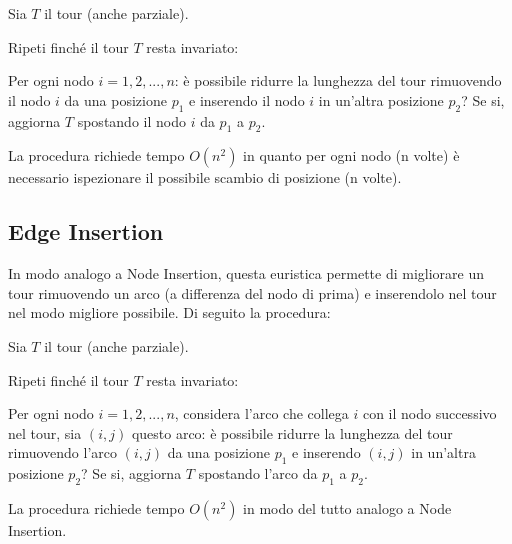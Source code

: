 \documentclass[a4paper,12pt]{report}
\begin{document}
\begin{tcolorbox}[colframe=black,colback=white,boxrule=0.5pt, sharp corners]
\begin{legal}
  \item Sia $T$ il tour (anche parziale).
  \item Ripeti finché il tour $T$ resta invariato:
  \begin{legal}
    \item Per ogni nodo $i = 1, 2, ..., n$: è possibile ridurre la lunghezza del tour rimuovendo il nodo $i$ da una posizione $p_1$ e inserendo il nodo $i$ in un'altra posizione $p_2$? Se si, aggiorna $T$ spostando il nodo $i$ da $p_1$ a $p_2$.
  \end{legal}
\end{legal}
\end{tcolorbox}
\hfill \break
La procedura richiede tempo $O(n^2)$ in quanto per ogni nodo (n volte) è necessario ispezionare il possibile scambio di posizione (n volte).

\subsection{Edge Insertion}
In modo analogo a Node Insertion, questa euristica permette di migliorare un tour rimuovendo un arco (a differenza del nodo di prima) e inserendolo nel tour nel modo migliore possibile. Di seguito la procedura:

\begin{tcolorbox}[colframe=black,colback=white,boxrule=0.5pt, sharp corners]
\begin{legal}
  \item Sia $T$ il tour (anche parziale).
  \item Ripeti finché il tour $T$ resta invariato:
  \begin{legal}
    \item Per ogni nodo $i = 1, 2, ..., n$, considera l'arco che collega $i$ con il nodo successivo nel tour, sia $(i, j)$ questo arco: è possibile ridurre la lunghezza del tour rimuovendo l'arco $(i, j)$ da una posizione $p_1$ e inserendo $(i, j)$ in un'altra posizione $p_2$? Se si, aggiorna $T$ spostando l'arco da $p_1$ a $p_2$.
  \end{legal}
\end{legal}
\end{tcolorbox}
\hfill \break
La procedura richiede tempo $O(n^2)$ in modo del tutto analogo a Node Insertion.
\end{document}

